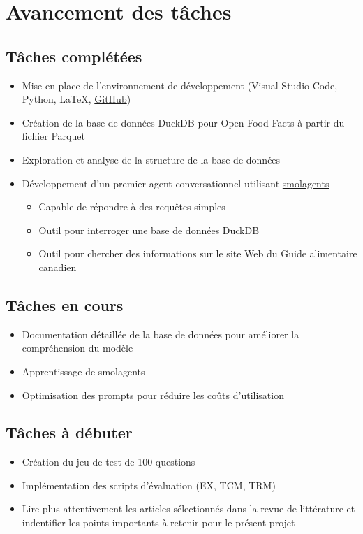 \documentclass[12pt]{article}
\begin{document}
\section{Avancement des tâches}

\subsection{Tâches complétées}
\begin{itemize}
    \item Mise en place de l'environnement de développement (Visual Studio Code, Python, \LaTeX, \href{https://github.com/boisalai/ift-6005}{GitHub})
    \item Création de la base de données DuckDB pour Open Food Facts à partir du fichier Parquet
    \item Exploration et analyse de la structure de la base de données
    \item Développement d'un premier agent conversationnel utilisant \href{https://github.com/huggingface/smolagents}{smolagents}
        \begin{itemize}
            \item Capable de répondre à des requêtes simples
            \item Outil pour interroger une base de données DuckDB
            \item Outil pour chercher des informations sur le site Web du Guide alimentaire canadien 
        \end{itemize}
\end{itemize}

\subsection{Tâches en cours}
\begin{itemize}
    \item Documentation détaillée de la base de données pour améliorer la compréhension du modèle
    \item Apprentissage de smolagents
    \item Optimisation des prompts pour réduire les coûts d'utilisation
\end{itemize}

\subsection{Tâches à débuter}
\begin{itemize}
    \item Création du jeu de test de 100 questions
    \item Implémentation des scripts d'évaluation (EX, TCM, TRM)
    \item Lire plus attentivement les articles sélectionnés dans la revue de littérature et indentifier les points importants à retenir pour le présent projet
\end{itemize}
\end{document}
